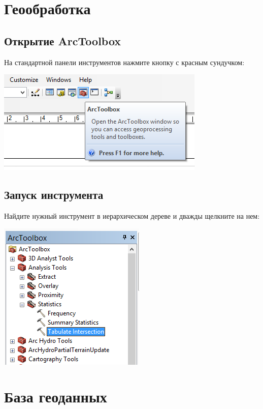 \documentclass[]{book}
\theoremstyle{definition}
\theoremstyle{definition}
\theoremstyle{definition}
\theoremstyle{remark}
\begin{document}
\hypertarget{manual-toolbox}{%
\chapter{Геообработка}\label{manual-toolbox}}

\hypertarget{-arctoolbox}{%
\section{Открытие ArcToolbox}\label{-arctoolbox}}

На стандартной панели инструментов нажмите кнопку с красным сундучком:

\includegraphics{images/Appendix/image97.png}

\hypertarget{-}{%
\section{Запуск инструмента}\label{-}}

Найдите нужный инструмент в иерархическом дереве и дважды щелкните на
нем:

\includegraphics{images/Appendix/image98.png}

\hypertarget{manual-gdb}{%
\chapter{База геоданных}\label{manual-gdb}}
\end{document}
